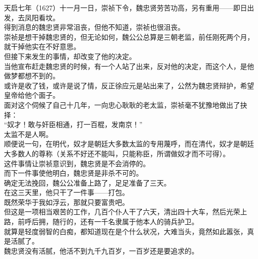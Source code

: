 \begin{multicols}{\theparacolNo}
天启七年（1627）十一月一日，崇祯下令，魏忠贤劳苦功高，另有重用——即日出发，去凤阳看坟。\\

得到消息的魏忠贤非常沮丧，但他不知道，崇祯也很沮丧。\\

崇祯是想干掉魏忠贤的，但无论如何，魏公公总算是三朝老监，前任刚死两个月，就干掉他实在不好意思。\\

但接下来发生的事情，却改变了他的决定。\\

当他宣布赶走魏忠贤的时候，有一个人站了出来，反对他的决定，而这个人，是他做梦都想不到的。\\

或许是收了钱，或许是说了情，反正徐应元是站出来了，公然为魏忠贤辩护，希望皇帝给他个面子。\\

面对这个伺候了自己十几年，一向忠心耿耿的老太监，崇祯毫不犹豫地做出了抉择：\\

“奴才！敢与奸臣相通，打一百棍，发南京！”\\

太监不是人啊。\\

顺便说一句，在明代，奴才是朝廷大多数太监的专用蔑呼，而在清代，奴才是朝廷大多数人的尊称（关系不好还不能叫，只能称臣，所谓做奴才而不可得）。\\

这件事情让崇祯意识到，魏忠贤是不会消停的。\\

而下一件事使他明白，魏忠贤是非杀不可的。\\

确定无法挽回，魏公公准备上路了，足足准备了三天。\\

在这三天里，他只干了一件事——打包。\\

既然荣华于我如浮云，那就只要富贵吧。\\

但这是一项相当艰苦的工作，几百个仆人干了六天，清出四十大车，然后光荣上路，前呼后拥，随行的，还有一千名隶属于他本人的骑兵护卫。\\

就算是轻度弱智的白痴，都知道现在是个什么状况，大难当头，竟然如此嚣张，真是活腻了。\\

魏忠贤没有活腻，他活不到九千九百岁，一百岁还是要追求的。\\


\end{multicols}
